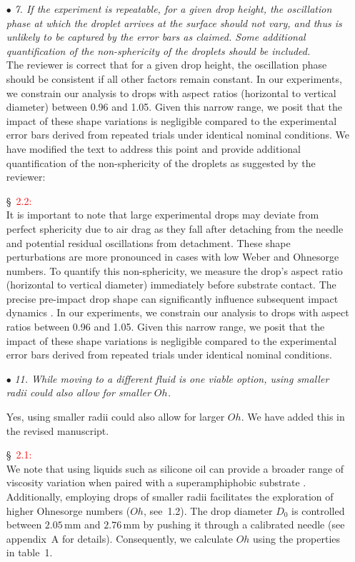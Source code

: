 \documentclass[]{article}
\newcommand*\red{\textcolor{red}}
\newcommand{\oo}{\color{magenta} \normalfont}
\newcommand{\bb}{\color{black} \normalfont}
\begin{document}
\begin{enumerate}
	\item[$\bullet$] \textit{7. If the experiment is repeatable, for a given drop height, the oscillation phase at which the droplet arrives at the surface should not vary, and thus is unlikely to be captured by the error bars as claimed. Some additional quantification of the non-sphericity of the droplets should be included.}\\[1 mm]
	
	The reviewer is correct that for a given drop height, the oscillation phase should be consistent if all other factors remain constant. In our experiments, we constrain our analysis to drops with aspect ratios (horizontal to vertical diameter) between 0.96 and 1.05. Given this narrow range, we posit that the impact of these shape variations is negligible compared to the experimental error bars derived from repeated trials under identical nominal conditions. We have modified the text to address this point and provide additional quantification of the non-sphericity of the droplets as suggested by the reviewer: 
	
	\S~\red{2.2:}\\
	\oo
	It is important to note that large experimental drops may deviate from perfect sphericity due to air drag as they fall after detaching from the needle and potential residual oscillations from detachment. These shape perturbations are more pronounced in cases with low Weber and Ohnesorge numbers. To quantify this non-sphericity, we measure the drop's aspect ratio (horizontal to vertical diameter) immediately before substrate contact. The precise pre-impact drop shape can significantly influence subsequent impact dynamics \citep{thoraval-2013-jfm, yun2017bouncing,Zhang2019}. In our experiments, we constrain our analysis to drops with aspect ratios between 0.96 and 1.05. Given this narrow range, we posit that the impact of these shape variations is negligible compared to the experimental error bars derived from repeated trials under identical nominal conditions.
	\bb
	
	\item[$\bullet$] \textit{11. While moving to a different fluid is one viable option, using smaller radii could also allow for smaller $Oh$.}
	
	Yes, using smaller radii could also allow for larger $Oh$. We have added this in the revised manuscript. 
	
	\S~\red{2.1:}\\
	\oo 
	We note that using liquids such as silicone oil can provide a broader range of viscosity variation when paired with a superamphiphobic substrate \citep{deng2012candle}. Additionally, employing drops of smaller radii facilitates the exploration of higher Ohnesorge numbers ($Oh$, see~1.2). 
	The drop diameter $D_0$ is controlled between $2.05\,\si{\milli\meter}$ and $2.76\,\si{\milli\meter}$ by pushing it through a calibrated needle (see appendix~A for details). 
	Consequently, we calculate $Oh$ using the properties in table~1.\bb
	

\end{enumerate}
\end{document}
